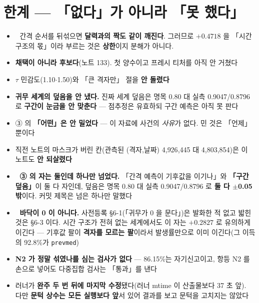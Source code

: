 \documentclass{article}
\begin{document}
\section{한계 --- 「없다」가 아니라 「못 했다」}

\begin{itemize}
\item 🔴 
      {간격 순서를 뒤섞으면 \textbf{달력과의 짝도 같이 깨진다}.
      그러므로 $+0.4718$ 을 「시간 구조의 몫」이라 부르는 것은 \textbf{상한}이지 분해가 아니다.}
\item \textbf{채택이 아니라 후보다}(노트 133). 첫 양수이고 프레시 티처를 아직 안 거쳤다
\item $\tau$ 민감도(1.10$\cdot$1.50)와 「큰 격자만」 절을 \textbf{안 돌렸다}
\item \textbf{귀무 세계의 덮음을 안 냈다.} 진짜 세계 덮음은 명목 0.80 대 실측 0.9047/0.8796 로
      \textbf{구간이 눈금을 안 맞춘다} --- 점추정은 유효하되 구간 예측은 아직 못 판다
\item ③ 의 \textbf{「어떤」은 안 밀었다} --- 이 자료에 사건의 \emph{사유}가 없다.
      민 것은 「언제」뿐이다
\item 직전 노트의 마스크가 버린 칸(관측된 (격자,날짜) 4{,}926{,}445 대 4{,}803{,}854)은
      이 노트도 \textbf{안 되살렸다}
\item 🔴 \textbf{③ 의 자는 둘인데 하나만 넘었다.} 「간격 예측이 기후값을 이기나」와
      \textbf{「구간 덮음」}이 둘 다 자인데, 덮음은 명목 0.80 대 실측 0.9047/0.8796 로
      \textbf{둘 다 $\pm$0.05 밖}이다. 커밋 제목은 넘은 하나만 말했다
\item 🔴 \textbf{바닥이 0 이 아니다.} 사전등록 §6-1(「귀무가 0 을 문다」)은 발화한 적 없고
      밟힌 것은 §6-3 이다. 시간 구조가 전혀 없는 세계에서도 이 자는 $+0.2827$ 로 유의하게 이긴다 ---
      기후값 팔이 \textbf{격자를 모르는 팔}이라서 발생률만으로 이미 이긴다(그 이득의 92.8\%가 \texttt{prevmed})
\item \textbf{N2 가 정말 섞였나를 심는 검사가 없다} --- 86.15\%는 자기신고이고,
      항등 N2 를 손으로 넣어도 다중집합 검사는 「통과」를 낸다
\item 러너가 \textbf{완주 두 번 뒤에 마지막 수정}됐다(러너 mtime 이 산출물보다 37 초 앞).
      🔴 다만 \textbf{문턱 상수는 모든 실행보다 앞}서 있어 결과를 보고 문턱을 고치지는 않았다
\end{itemize}
\end{document}
